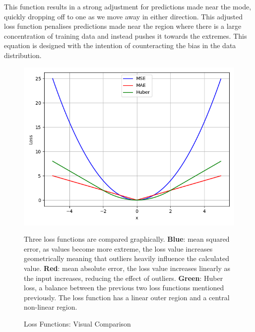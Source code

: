 \noindent
This function results in a strong adjustment for predictions made near the mode, quickly dropping off to one as we move away in either direction. This adjusted loss function penalises predictions made near the region where there is a large concentration of training data and instead pushes it towards the extremes. This equation is designed with the intention of counteracting the bias in the data distribution.


\begin{figure}[h]
	\centering
	\includegraphics[scale=0.35]{Figures/lossPlots.png}
	\caption{Loss Functions: Visual Comparison} {Three loss functions are compared graphically. \textbf{Blue}: mean squared error, as values become more extreme, the loss value increases geometrically meaning that outliers heavily influence the calculated value. \textbf{Red}: mean absolute error, the loss value increases linearly as the input increases, reducing the effect of outliers. \textbf{Green}: Huber loss, a balance between the previous two loss functions mentioned previously. The loss function has a linear outer region and a central non-linear region.}
	\label{fig:lossPlots}
\end{figure}

